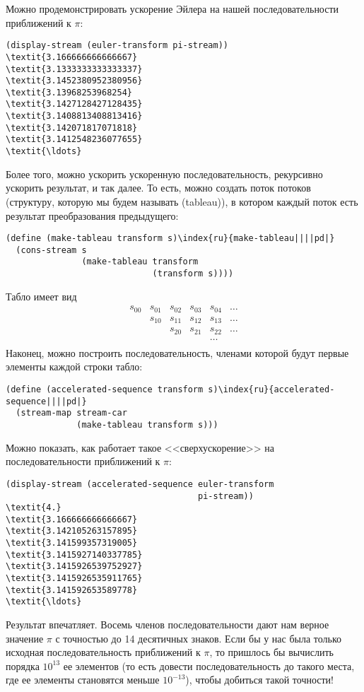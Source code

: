 Можно продемонстрировать ускорение Эйлера на нашей
последовательности приближений к $\pi$:

\begin{Verbatim}[fontsize=\small]
(display-stream (euler-transform pi-stream))
\textit{3.166666666666667}
\textit{3.1333333333333337}
\textit{3.1452380952380956}
\textit{3.13968253968254}
\textit{3.1427128427128435}
\textit{3.1408813408813416}
\textit{3.142071817071818}
\textit{3.1412548236077655}
\textit{\ldots}
\end{Verbatim}

Более того, можно ускорить ускоренную последовательность,
рекурсивно ускорить результат, и так далее.  То есть, можно создать
поток потоков (структуру, которую мы будем называть
 (tableau)), в котором каждый поток есть
результат преобразования предыдущего:

\begin{Verbatim}[fontsize=\small]
(define (make-tableau transform s)\index{ru}{make-tableau||||pd|}
  (cons-stream s
               (make-tableau transform
                             (transform s))))
\end{Verbatim}
Табло имеет вид
$$
\begin{array}{cccccc}
s_{00} & s_{01} & s_{02} & s_{03} & s_{04} & \ldots\\
       & s_{10} & s_{11} & s_{12} & s_{13} & \ldots\\
       &        & s_{20} & s_{21} & s_{22} & \ldots\\
       &        &        &        & \ldots\\
\end{array}
$$
Наконец, можно построить последовательность, членами которой будут
первые элементы каждой строки табло:

\begin{Verbatim}[fontsize=\small]
(define (accelerated-sequence transform s)\index{ru}{accelerated-sequence||||pd|}
  (stream-map stream-car
              (make-tableau transform s)))
\end{Verbatim}

Можно показать, как работает такое <<сверхускорение>> на
последовательности приближений к $\pi$:

\begin{Verbatim}[fontsize=\small]
(display-stream (accelerated-sequence euler-transform
                                      pi-stream))
\textit{4.}
\textit{3.166666666666667}
\textit{3.142105263157895}
\textit{3.141599357319005}
\textit{3.1415927140337785}
\textit{3.1415926539752927}
\textit{3.1415926535911765}
\textit{3.141592653589778}
\textit{\ldots}
\end{Verbatim}
Результат впечатляет.  Восемь членов последовательности дают нам
верное значение $\pi$ с точностью до 14 десятичных знаков.
Если бы у нас была только исходная последовательность приближений к
$\pi$, то пришлось бы вычислить порядка $10^{13}$
ее элементов (то есть довести последовательность до такого места, где
ее элементы становятся меньше $10^{-13}$), чтобы добиться
такой точности!

